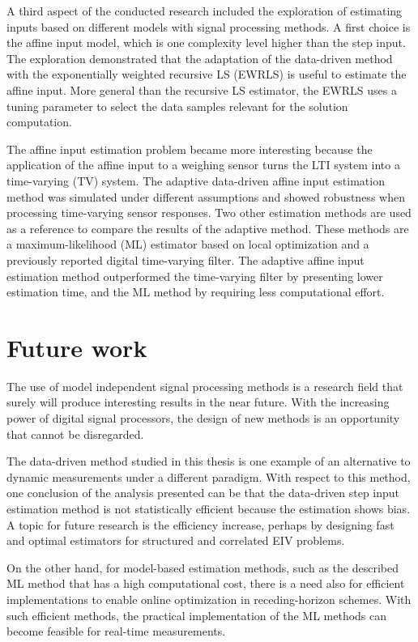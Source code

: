 A third aspect of the conducted research included the exploration of estimating inputs based on different models with signal processing methods. 
A first choice is the affine input model, which is one complexity level higher than the step input.
The exploration demonstrated that the adaptation of the data-driven method with the exponentially weighted recursive LS (EWRLS) is useful to estimate the affine input.
More general than the recursive LS estimator, the EWRLS uses a tuning parameter to select the data samples relevant for the solution computation.

The affine input estimation problem became more interesting because the application of the affine input to a weighing sensor turns the LTI system into a time-varying (TV) system. 
The adaptive data-driven affine input estimation method was simulated under different assumptions and showed robustness when processing time-varying sensor responses.
Two other estimation methods are used as a reference to compare the results of the adaptive method.
These methods are a maximum-likelihood (ML) estimator based on local optimization and a previously reported digital time-varying filter.
The adaptive affine input estimation method outperformed the time-varying filter by presenting lower estimation time, and the ML method by requiring less computational effort.  


\section*{Future work}

The use of model independent signal processing methods is a research field that surely will produce interesting results in the near future. 
With the increasing power of digital signal processors, the design of new methods is an opportunity that cannot be disregarded.

The data-driven method studied in this thesis is one example of an alternative to dynamic measurements under a different paradigm.
With respect to this method, one conclusion of the analysis presented can be that the data-driven step input estimation method is not statistically efficient because the estimation shows bias.
A topic for future research is the efficiency increase, perhaps by designing fast and optimal estimators for structured and correlated EIV problems. 

On the other hand, for model-based estimation methods, such as the described ML method that has a high computational cost, there is a need also for efficient implementations to enable online optimization in receding-horizon schemes. 
With such efficient methods, the practical implementation of the ML methods can become feasible for real-time measurements.



